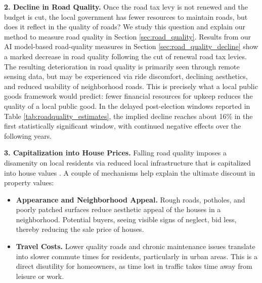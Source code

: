 
\noindent
{\bf 2. Decline in Road Quality.} Once the road tax levy is not renewed and the budget is cut, the local government has fewer resources to maintain roads, but does it reflect in the quality of roads? We study this question and explain our method to measure road quality in Section \ref{sec:road_quality}. Results from our AI model-based road-quality measures in Section \ref{sec:road_quality_decline} show a marked decrease in road quality following the cut of renewal road tax levies. The resulting deterioration in road quality is primarily seen through remote sensing data, but may be experienced via ride discomfort, declining aesthetics, and reduced usability of neighborhood roads. This is precisely what a local public goods framework would predict: fewer financial resources for upkeep reduces the quality of a local public good. In the delayed post-election windows reported in Table \ref{tab:roadquality_estimates}, the implied decline reaches about 16\% in the first statistically significant window, with continued negative effects over the following years.

\noindent
{\bf 3. Capitalization into House Prices.} Falling road quality imposes a disamenity on local residents via reduced local infrastructure that is capitalized into house values \citep{Oates1969}. A couple of mechanisms help explain the ultimate discount in property values:

\begin{itemize}
    \item \textbf{Appearance and Neighborhood Appeal.} Rough roads, potholes, and poorly patched surfaces reduce aesthetic appeal of the houses in a neighborhood. Potential buyers, seeing visible signs of neglect, bid less, thereby reducing the sale price of houses. 
    \item \textbf{Travel Costs.} Lower quality roads and chronic maintenance issues translate into slower commute times for residents, particularly in urban areas. This is a direct disutility for homeowners, as time lost in traffic takes time away from leisure or work.
\end{itemize}

